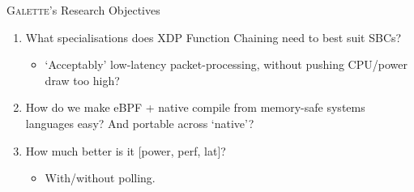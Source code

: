 \documentclass[aspectratio=169,xcolor={dvipsnames}
,handout
]{beamer}
\newcommand{\ourtech}{\textsc{Galette}}
\begin{document}
\begin{frame}{\ourtech{}'s Research Objectives}
	\begin{enumerate}
		\item What specialisations does XDP Function Chaining need to best suit SBCs?
		\begin{itemize}
			\item `Acceptably' low-latency packet-processing, without pushing CPU/power draw too high?
		\end{itemize}
		\item How do we make eBPF + native compile from memory-safe systems languages easy? And portable across `native'?
		\item How much better is it [power, perf, lat]?
		\begin{itemize}
			\item With/without polling.
		\end{itemize}
	\end{enumerate}
%		
\end{frame}
\end{document}
